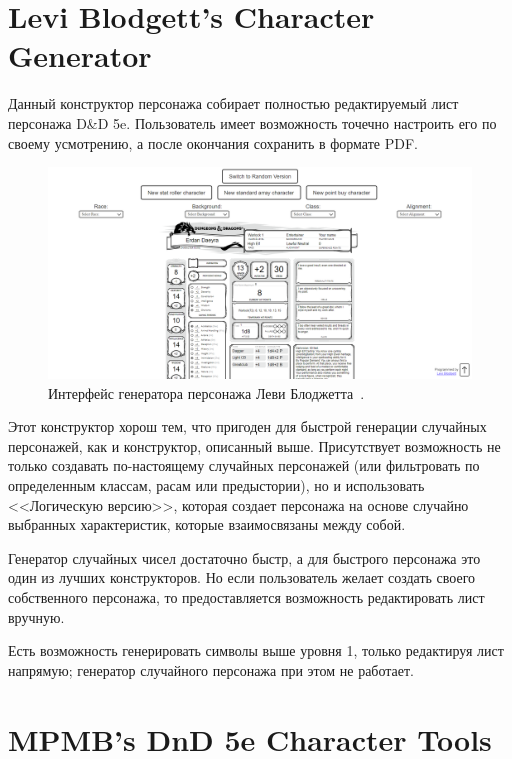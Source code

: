 \section{Levi Blodgett’s Character Generator}

Данный конструктор персонажа собирает полностью редактируемый лист персонажа D\&D 5e. Пользователь имеет возможность точечно настроить его по своему усмотрению, а после окончания сохранить в формате PDF.

\begin{figure}[H]
    \centering
    \includegraphics[scale=0.3]{Levi_Blodgett.png}
    \caption{Интерфейс генератора персонажа Леви Блоджетта~\cite{levi}.}
    \label{fig:blodgett}
\end{figure}

Этот конструктор хорош тем, что пригоден для быстрой генерации случайных персонажей, как и конструктор, описанный выше. Присутствует возможность не только создавать по-настоящему случайных персонажей (или фильтровать по определенным классам, расам или предыстории), но и использовать <<Логическую версию>>, которая создает персонажа на основе случайно выбранных характеристик, которые взаимосвязаны между собой.

Генератор случайных чисел достаточно быстр, а для быстрого персонажа это один из лучших конструкторов. Но если пользователь желает создать своего собственного персонажа, то предоставляется возможность редактировать лист вручную.

Есть возможность генерировать символы выше уровня 1, только редактируя лист напрямую; генератор случайного персонажа при этом не работает.

\section{MPMB’s DnD 5e Character Tools}

